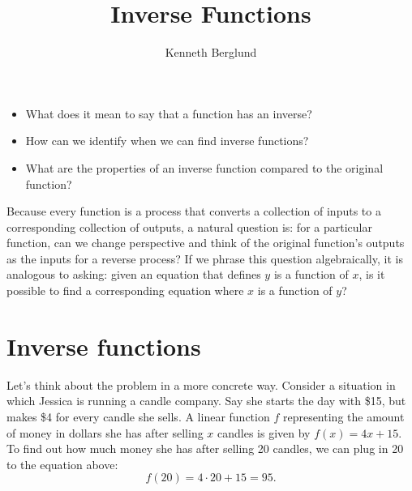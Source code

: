 \documentclass[nooutcomes]{ximera}
\author{Kenneth Berglund}
\title{Inverse Functions}
\begin{document}
\begin{abstract}
  
\end{abstract}
\maketitle



\begin{motivatingQuestions}\begin{itemize}
\item What does it mean to say that a function has an inverse? 
\item How can we identify when we can find inverse functions?
\item What are the properties of an inverse function compared to the original function?
\end{itemize}\end{motivatingQuestions}



Because every function is a process that converts a collection of inputs to a corresponding collection of outputs, a natural question is: for a particular function, can we change perspective and think of the original function's outputs as the inputs for a reverse process? If we phrase this question algebraically, it is analogous to asking: given an equation that defines $y$ is a function of $x$, is it possible to find a corresponding equation where $x$ is a function of $y$?



\section{Inverse functions}
Let's think about the problem in a more concrete way. Consider a situation in which Jessica is running a candle company. Say she starts the day with \$15, but makes \$4 for every candle she sells. A linear function $f$ representing the amount of money in dollars she has after selling $x$ candles is given by $f(x) = 4x + 15$. To find out how much money she has after selling 20 candles, we can plug in 20 to the equation above:
$$
f(20) = 4\cdot 20 + 15 = 95.
$$
\end{document}
